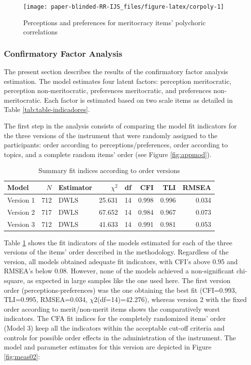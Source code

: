 \documentclass[
  10pt,
  a4paper,
]{article}
\begin{document}
\begin{figure}[H]

{\centering \texttt{[image: paper-blinded-RR-IJS\_files/figure-latex/corpoly-1]} 

}

\caption{Perceptions and preferences for meritocracy items' polychoric correlations}\label{fig:corpoly}
\end{figure}

\subsubsection{Confirmatory Factor Analysis}\label{confirmatory-factor-analysis-1}

The present section describes the results of the confirmatory factor analysis estimation. The model estimates four latent factors: perception meritocratic, perception non-meritocratic, preferences meritocratic, and preferences non-meritocratic. Each factor is estimated based on two scale items as detailed in Table \ref{tab:table-indicadores}.

The first step in the analysis consists of comparing the model fit indicators for the three versions of the instrument that were randomly assigned to the participants: order according to perceptions/preferences, order according to topics, and a complete random items' order (see Figure \ref{fig:appmod}).

\begin{table}[H]

\caption{\label{tab:table-cfafits}Summary fit indices according to order versions}
\centering
\fontsize{10}{12}\selectfont
\begin{tabular}[t]{lrlrrrrr}
\toprule
Model & $N$ & Estimator & $\chi^2$ & df & CFI & TLI & RMSEA\\
\midrule
Version 1 & 712 & DWLS & 25.631 & 14 & 0.998 & 0.996 & 0.034\\
Version 2 & 717 & DWLS & 67.652 & 14 & 0.984 & 0.967 & 0.073\\
Version 3 & 712 & DWLS & 41.633 & 14 & 0.991 & 0.981 & 0.053\\
\bottomrule
\end{tabular}
\end{table}

Table \ref{tab:table-cfafits} shows the fit indicators of the models estimated for each of the three versions of the items' order described in the methodology. Regardless of the version, all models obtained adequate fit indicators, with CFI's above 0.95 and RMSEA's below 0.08. However, none of the models achieved a non-significant chi-square, as expected in large samples like the one used here. The first version order (perceptions-preferences) was the one obtaining the best fit (CFI=0.993, TLI=0.995, RMSEA=0.034, \(\chi2\)(df=14)=42.276), whereas version 2 with the fixed order according to merit/non-merit items shows the comparatively worst indicators. The CFA fit indices for the completely randomized items' order (Model 3) keep all the indicators within the acceptable cut-off criteria and controls for possible order effects in the administration of the instrument. The model and parameter estimates for this version are depicted in Figure \ref{fig:meas02}:
\end{document}
